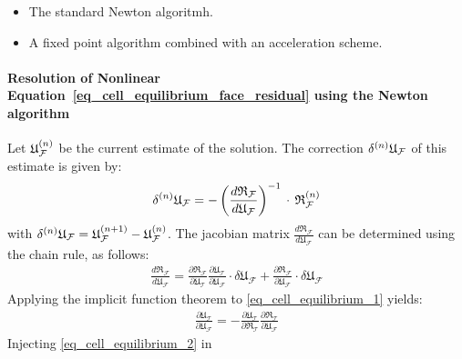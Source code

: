 \begin{itemize}
  \item The standard Newton algoritmh.
  \item A fixed point algorithm combined with an acceleration scheme.
\end{itemize}

\paragraph{Resolution of Nonlinear Equation~\eqref{eq_cell_equilibrium_face_residual} using the Newton algorithm}

Let \(\iter{n}{\mathfrak{U}_{\mathcal{F}}}\) be the current estimate
of the solution. The correction
\(\iter{n}{\delta}\mathfrak{U}_{\mathcal{F}}\) of this estimate is given
by:
\[
\iter{n}{\delta}\mathfrak{U}_{\mathcal{F}}=
-\left( \frac{d\mathfrak{R}_{\mathcal{F}}}{d \mathfrak{U}_{\mathcal{F}}}
\right)^{-1} \,\cdot\,\iter{n}{\mathfrak{R}}_{\mathcal{F}}
\]
with
\(\iter{n}{\delta}\mathfrak{U}_{\mathcal{F}}=\iter{n+1}{\mathfrak{U}_{\mathcal{F}}}-\iter{n}{\mathfrak{U}_{\mathcal{F}}}\).
%
%
%
The jacobian matrix \(\frac{d\mathfrak{R}_{\mathcal{F}}}{d
  \mathfrak{U}_{\mathcal{F}}}\) can be determined using the chain rule,
as follows:
\begin{equation}
  \label{eq_cell_equilibrium_0}
  \begin{aligned}
    \frac{d\mathfrak{R}_{\mathcal{F}}}{d
      \mathfrak{U}_{\mathcal{F}}}
    = \frac{\partial
      \mathfrak{R}_{\mathcal{F}}}{\partial \mathfrak{U}_{\mathcal{T}}}
    \frac{\partial \mathfrak{U}_{\mathcal{T}}}{\partial
      \mathfrak{U}_{\mathcal{F}}} \cdot \delta
    \mathfrak{U}_{\mathcal{F}} + \frac{\partial
      \mathfrak{R}_{\mathcal{F}}}{\partial \mathfrak{U}_{\mathcal{F}}}
    \cdot \delta \mathfrak{U}_{\mathcal{F}}
  \end{aligned}
\end{equation}
Applying the implicit function theorem to
\eqref{eq_cell_equilibrium_1} yields:
\begin{equation}
  \label{eq_cell_equilibrium_2}
  \begin{aligned}
    \frac{\partial
      \mathfrak{U}_{\mathcal{T}}}{\partial \mathfrak{U}_{\mathcal{F}}} =
    - \frac{\partial \mathfrak{U}_{\mathcal{T}}}{\partial
      \mathfrak{R}_{\mathcal{T}}} \frac{\partial
      \mathfrak{R}_{\mathcal{T}}}{\partial \mathfrak{U}_{\mathcal{F}}}
  \end{aligned}
\end{equation}
Injecting \eqref{eq_cell_equilibrium_2} in
